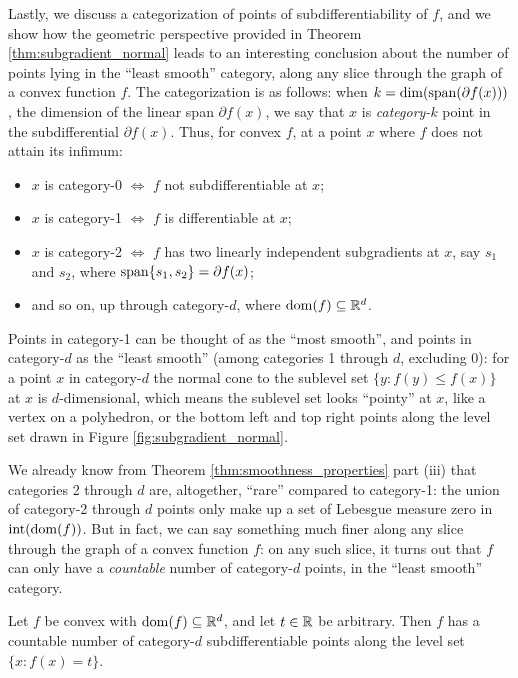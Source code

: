 Lastly, we discuss a categorization of points of subdifferentiability of $f$,
and we show how the geometric perspective provided in Theorem
\ref{thm:subgradient_normal} leads to an interesting conclusion about the number 
of points lying in the ``least smooth'' category, along any slice through the
graph of a convex function $f$. The categorization is as follows: when $k =
\operatorname{dim}(\operatorname{span}(\partial f(x)))$, the dimension of the linear span $\partial f(x)$, we
say that $x$ is \emph{category-$k$} point in the subdifferential $\partial
f(x)$. Thus, for convex $f$, at a point $x$ where $f$ does not attain its 
infimum: 
\begin{itemize}
\item $x$ is category-0 $\iff$ $f$ not subdifferentiable at $x$;
\item $x$ is category-1 $\iff$ $f$ is differentiable at $x$;
\item $x$ is category-2 $\iff$ $f$ has two linearly independent subgradients at 
  $x$, say $s_1$ and $s_2$, where $\operatorname{span}\{s_1, s_2\} = \partial f(x)$; 
\item and so on, up through category-$d$, where $\operatorname{dom}(f) \subseteq \mathbb{R}^d$. 
\end{itemize}
Points in category-1 can be thought of as the ``most smooth'', and points in
category-$d$ as the ``least smooth'' (among categories 1 through $d$, excluding
0): for a point $x$ in category-$d$ the normal cone to the sublevel set $\{y :
f(y) \leq f(x)\}$ at $x$ is $d$-dimensional, which means the sublevel set looks
``pointy'' at $x$, like a vertex on a polyhedron, or the bottom left and top
right points along the level set drawn in Figure \ref{fig:subgradient_normal}.   

We already know from Theorem \ref{thm:smoothness_properties} part (iii) that
categories 2 through $d$ are, altogether, ``rare'' compared to category-1: the
union of category-2 through $d$ points only make up a set of Lebesgue measure 
zero in $\operatorname{int}(\operatorname{dom}(f))$. But in fact, we can say something much finer along
any slice through the graph of a convex function $f$: on any such slice, it
turns out that $f$ can only have a \emph{countable} number of category-$d$
points, in the ``least  smooth'' category.   

\begin{Theorem}
\label{thm:subgradient_category_d}
Let $f$ be convex with $\operatorname{dom}(f) \subseteq \mathbb{R}^d$, and let $t \in \mathbb{R}$ be
arbitrary.  Then $f$ has a countable number of category-$d$ subdifferentiable
points along the level set $\{x : f(x) = t\}$. 
\end{Theorem}

